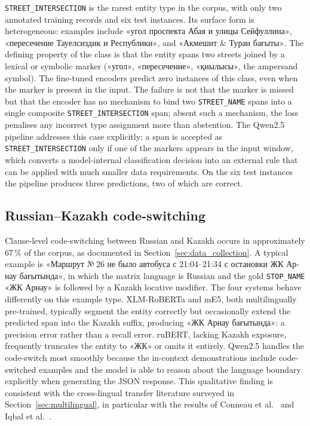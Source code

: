 \texttt{STREET\_INTERSECTION} is the rarest entity type in the corpus, with only two annotated training records and six test instances. Its surface form is heterogeneous: examples include \foreignlanguage{russian}{«угол проспекта Абая и улицы Сейфуллина»}, \foreignlanguage{russian}{«пересечение Тауелсиздик и Республики»}, and \foreignlanguage{russian}{«Акмешит \& Туран бағыты»}. The defining property of the class is that the entity spans two streets joined by a lexical or symbolic marker (\foreignlanguage{russian}{«угол»}, \foreignlanguage{russian}{«пересечение»}, \foreignlanguage{russian}{«қиылысы»}, the ampersand symbol). The fine-tuned encoders predict zero instances of this class, even when the marker is present in the input. The failure is not that the marker is missed but that the encoder has no mechanism to bind two \texttt{STREET\_NAME} spans into a single composite \texttt{STREET\_INTERSECTION} span; absent such a mechanism, the loss penalises any incorrect type assignment more than abstention. The Qwen2.5 pipeline addresses this case explicitly: a span is accepted as \texttt{STREET\_INTERSECTION} only if one of the markers appears in the input window, which converts a model-internal classification decision into an external rule that can be applied with much smaller data requirements. On the six test instances the pipeline produces three predictions, two of which are correct.

\subsection{Russian--Kazakh code-switching}
\label{sec:hard_codeswitch}

Clause-level code-switching between Russian and Kazakh occurs in approximately $67\,\%$ of the corpus, as documented in Section~\ref{sec:data_collection}. A typical example is \foreignlanguage{russian}{«Маршрут №\,26 не было автобуса с 21:04--21:34 с остановки ЖК Арнау бағытында»}, in which the matrix language is Russian and the gold \texttt{STOP\_NAME} \foreignlanguage{russian}{«ЖК Арнау»} is followed by a Kazakh locative modifier. The four systems behave differently on this example type. XLM-RoBERTa and mE5, both multilingually pre-trained, typically segment the entity correctly but occasionally extend the predicted span into the Kazakh suffix, producing \foreignlanguage{russian}{«ЖК Арнау бағытында»}: a precision error rather than a recall error. ruBERT, lacking Kazakh exposure, frequently truncates the entity to \foreignlanguage{russian}{«ЖК»} or omits it entirely. Qwen2.5 handles the code-switch most smoothly because the in-context demonstrations include code-switched examples and the model is able to reason about the language boundary explicitly when generating the JSON response. This qualitative finding is consistent with the cross-lingual transfer literature surveyed in Section~\ref{sec:multilingual}, in particular with the results of Conneau et al.~\cite{conneau2020xlmr} and Iqbal et al.~\cite{iqbal2024multilingual}.

